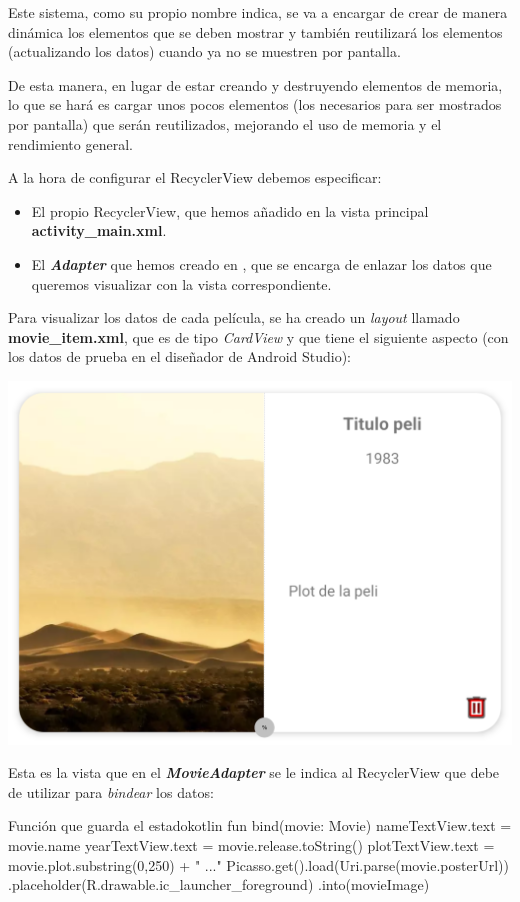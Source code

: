 \documentclass{\ClassPath/viu-tfm-template}
\begin{document}
Este sistema, como su propio nombre indica, se va a encargar de crear de manera dinámica los elementos que se deben mostrar y también reutilizará los elementos (actualizando los datos) cuando ya no se muestren por pantalla.

De esta manera, en lugar de estar creando y destruyendo elementos de memoria, lo que se hará es cargar unos pocos elementos (los necesarios para ser mostrados por pantalla) que serán reutilizados, mejorando el uso de memoria y el rendimiento general.

A la hora de configurar el RecyclerView debemos especificar:
\begin{itemize}
    \item El propio RecyclerView, que hemos añadido en la vista principal \textbf{activity\_main.xml}.

    \item El \textit{\textbf{Adapter}} que hemos creado en , que se encarga de enlazar los datos que queremos visualizar con la vista correspondiente.
\end{itemize}

Para visualizar los datos de cada película, se ha creado un \textit{layout} llamado \textbf{movie\_item.xml}, que es de tipo \textit{CardView} y que tiene el siguiente aspecto (con los datos de prueba en el diseñador de Android Studio):

\begin{center}
    \vspace{-15pt}
    \includegraphics[width=0.6\linewidth]{img/movie_item.png}
    \vspace{-20pt}
\end{center}

Esta es la vista que en el \textbf{\textit{MovieAdapter}} se le indica al RecyclerView que debe de utilizar para \textit{bindear} los datos:

\begin{mycode}{Función que guarda el estado}{kotlin}{}
fun bind(movie: Movie) {
    nameTextView.text = movie.name
    yearTextView.text = movie.release.toString()
    plotTextView.text = movie.plot.substring(0,250) + " ..."
    Picasso.get().load(Uri.parse(movie.posterUrl))
        .placeholder(R.drawable.ic_launcher_foreground)
       .into(movieImage)
}
\end{mycode}
\end{document}
